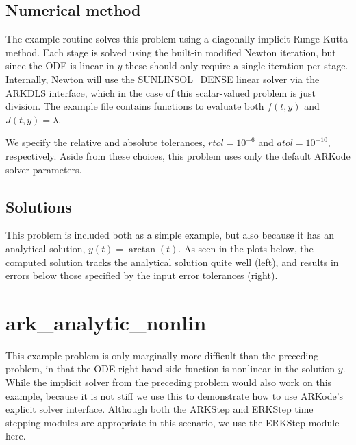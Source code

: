 \documentclass[letterpaper,10pt,english]{sphinxmanual}
\begin{document}
\subsection{Numerical method}
\label{\detokenize{c_serial:numerical-method}}
The example routine solves this problem using a diagonally-implicit
Runge-Kutta method.  Each stage is solved using the built-in modified
Newton iteration, but since the ODE is linear in \(y\) these
should only require a single iteration per stage.  Internally, Newton
will use the SUNLINSOL\_DENSE linear solver via the ARKDLS interface,
which in the case of this scalar-valued problem is just division.  The
example file contains functions to evaluate both \(f(t,y)\) and
\(J(t,y)=\lambda\).

We specify the relative and absolute tolerances, \(rtol=10^{-6}\)
and \(atol=10^{-10}\), respectively.  Aside from these choices,
this problem uses only the default ARKode solver parameters.


\subsection{Solutions}
\label{\detokenize{c_serial:solutions}}
This problem is included both as a simple example, but also because it
has an analytical solution, \(y(t) = \arctan(t)\).  As seen in the
plots below, the computed solution tracks the analytical solution
quite well (left), and results in errors below those specified by the input
error tolerances (right).

\noindent{}

\noindent{}


\section{ark\_analytic\_nonlin}
\label{\detokenize{c_serial:id2}}\label{\detokenize{c_serial:ark-analytic-nonlin}}
This example problem is only marginally more difficult than the
preceding problem, in that the ODE right-hand side function is
nonlinear in the solution \(y\).  While the implicit solver from
the preceding problem would also work on this example, because it is
not stiff we use this to demonstrate how to use ARKode’s explicit
solver interface.  Although both the ARKStep and ERKStep time stepping
modules are appropriate in this scenario, we use the ERKStep module
here.
\end{document}
